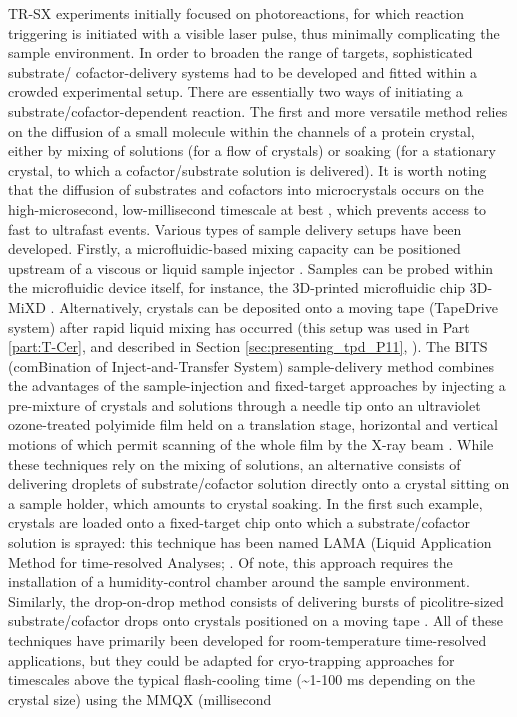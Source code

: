 TR-SX experiments initially focused on photoreactions, for which reaction triggering is initiated with a visible laser pulse, thus minimally complicating the sample environment. In order to broaden the range of targets, sophisticated substrate/ cofactor-delivery systems had to be developed and fitted within a crowded experimental setup. There are essentially two ways of initiating a substrate/cofactor-dependent reaction. The first and more versatile method relies on the diffusion of a small molecule within the channels of a protein crystal, either by mixing of solutions (for a flow of crystals) or soaking (for a stationary crystal, to which a cofactor/substrate solution is delivered). It is worth noting that the diffusion of substrates and cofactors into microcrystals occurs on the high-microsecond, low-millisecond timescale at best \parencite{makinenReactivityCryoenzymologyEnzymes1977,schmidtMixInjectReaction2013,pandeyObservationSubstrateDiffusion2021}, which prevents access to fast to ultrafast events. Various types of sample delivery setups have been developed. Firstly, a microfluidic-based mixing capacity can be positioned upstream of a viscous or liquid sample injector \parencite{wangDoublefocusingMixingJet2014, calveyMixingInjectorEnables2016, dopplerCoflowInjectionSerial2022}. Samples can be probed within the microfluidic device itself, for instance, the 3D-printed microfluidic chip 3D-MiXD \parencite{monteiro3DMiXD3DprintedXraycompatible2020}. Alternatively, crystals can be deposited onto a moving tape (TapeDrive system) after rapid liquid mixing has occurred (this setup was used in Part \ref{part:T-Cer}, and described in Section \ref{sec:presenting_tpd_P11}, \cite{beyerleinMixanddiffuseSerialSynchrotron2017, zielinskiRapidEfficientRoomtemperature2022}). The BITS (comBination of Inject-and-Transfer System) sample-delivery method combines the advantages of the sample-injection and fixed-target approaches by injecting a pre-mixture of crystals and solutions through a needle tip onto an ultraviolet ozone-treated polyimide film held on a translation stage, horizontal and vertical motions of which permit scanning of the whole film by the X-ray beam \parencite{leeUpgradedCombinedInjectandTransfer2022}. While these techniques rely on the mixing of solutions, an alternative consists of delivering droplets of substrate/cofactor solution directly onto a crystal sitting on a sample holder, which amounts to crystal soaking. In the first such example, crystals are loaded onto a fixed-target chip onto which a substrate/cofactor solution is sprayed: this technique has been named LAMA (Liquid Application Method for time-resolved Analyses; \parencite{mehrabiLiquidApplicationMethod2019}. Of note, this approach requires the installation of a humidity-control chamber around the sample environment. Similarly, the drop-on-drop method consists of delivering bursts of picolitre-sized substrate/cofactor drops onto crystals positioned on a moving tape \parencite{butrynOndemandDropondropMethod2021}. All of these techniques have primarily been developed for room-temperature time-resolved applications, but they could be adapted for cryo-trapping approaches for timescales above the typical flash-cooling time (\textasciitilde1-100 ms depending on the crystal size) using the MMQX (millisecond 